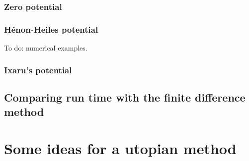 \subsubsection{Zero potential}\label{sec:c4_numerical_zero}

\subsubsection{Hénon-Heiles potential}\label{sec:c4_numerical_henon_heiles}

{\color{red}To do: numerical examples}.

\subsubsection{Ixaru's potential}\label{sec:c4_numerical_ixaru}

\subsection{Comparing run time with the finite difference method}\label{sec:c4_nm_vs_fd}

\section{Some ideas for a utopian method}\label{c4:sec_utopy}


\stopchapter
